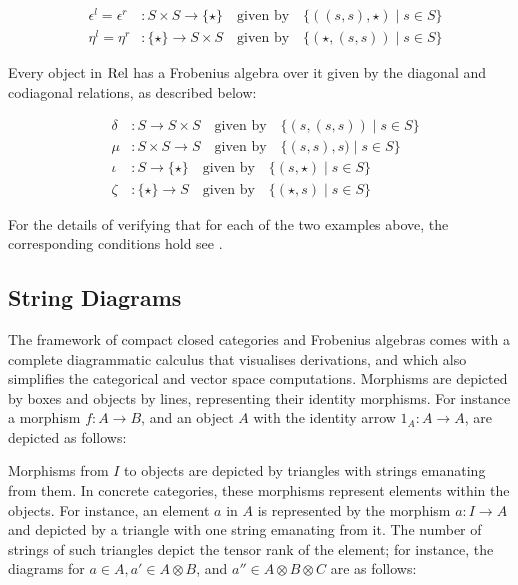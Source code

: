 \begin{eqnarray*}
&\epsilon^l  =  \epsilon^r &\colon   S \times S \to \{\star\} \quad \mbox{given by} \quad
\{((s, s), \star) \mid s \in S \}\\
&\eta^l = \eta^r& \colon   \{\star\}  \to S \times S
\quad \mbox{given by} \quad 
\{(\star, (s, s)) \mid s\in S\}
\end{eqnarray*}



Every object in $\mathrm{Rel}$  has a
Frobenius algebra over it given by the diagonal and codiagonal
relations, as described below: 



\begin{eqnarray*}
&\delta &\colon   S \to S \times S \quad \mbox{given by} \quad
\{(s, (s, s)) \mid s \in S \}\\
& \mu & \colon   S \times S \to S
\quad \mbox{given by} \quad 
\{(s, s), s) \mid s \in S\}\\
& \iota& \colon S \to  \{\star\}    \quad \mbox{given by} \quad \{(s, \star) \mid s \in S\}\\
&\zeta& \colon  \{\star\}  \to S  \quad \mbox{given by} \quad \{(\star, s) \mid s \in S\}
\end{eqnarray*}

For the details of verifying that for each of the two examples above,  the corresponding conditions hold see \cite{CoeckePaq}. 

\subsection{String Diagrams} 
\label{string}

The framework of compact closed categories and Frobenius algebras
comes with a complete diagrammatic calculus that visualises
derivations, and which also simplifies the
categorical and vector space computations. Morphisms are depicted by
boxes and objects by lines, representing their identity morphisms. For
instance a morphism $f \colon A \to B$, and an object $A$ with the
identity arrow $1_A \colon A \to A$, are depicted as follows:

\begin{center}
\end{center}

Morphisms from $I$ to objects are depicted by triangles with strings emanating from them. In concrete categories, these morphisms represent  elements within the  objects. For instance, an element $a$ in $A$ is represented by the morphism $a: I \to A$ and depicted by a  triangle with one string emanating from it. The number of strings of such triangles depict the tensor rank of the element; for instance, the
diagrams for ${a} \in A, {a'} \in A \otimes B$, and ${a''}
\in A \otimes B \otimes C$ are as follows:

